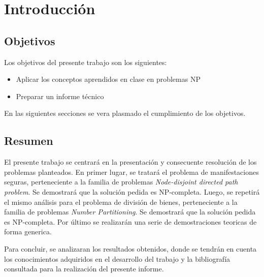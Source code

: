 \section{Introducción}

\subsection{Objetivos}
Los objetivos del presente trabajo son los siguientes:
\begin{itemize}
\item Aplicar los conceptos aprendidos en clase en problemas NP
\item Preparar un informe técnico
\end{itemize}

En las siguientes secciones se vera plasmado el cumplimiento de los objetivos.\newline

\subsection{Resumen}
El presente trabajo se centrará en la presentación y consecuente resolución de los problemas planteados.\newline 
En primer lugar, se tratará el problema de manifestaciones seguras, perteneciente a la familia de problemas \emph{Node-disjoint directed path problem}. Se demostrará que la solución pedida es NP-completa.
Luego, se repetirá el mismo análisis para el problema de división de bienes, perteneciente a la familia de problemas \emph{Number Partitioning}. Se demostrará que la solución pedida es NP-completa.
Por último se realizarán una serie de demostraciones teoricas de forma generica.

Para concluir, se analizaran los resultados obtenidos, donde se tendrán en cuenta los conocimientos adquiridos en el desarrollo del trabajo y la bibliografía consultada para la realización del presente informe.
